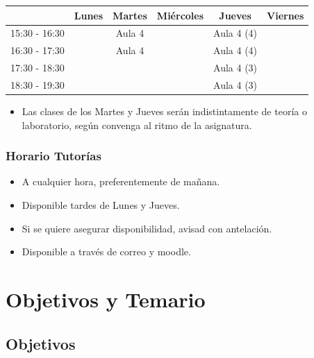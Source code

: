 \documentclass[a4paper,t,xcolor=pst,dvips,colortheme]{beamer}
\begin{document}
\begin{frame}[c]
\begin{small}
{\begin{center}
    	\begin{tabular}{||l|c|c|c|c|c||}
    	\hline \hline
    				   & Lunes & Martes  & Miércoles & Jueves     & Viernes \\ \hline \hline
        15:30 - 16:30  &       & Aula 4  &           & Aula 4 (4) &         \\ \hline
        16:30 - 17:30  &       & Aula 4  &           & Aula 4 (4) &         \\ \hline
    	17:30 - 18:30  &       &         &           & Aula 4 (3) &         \\ \hline
        18:30 - 19:30  &       &         &           & Aula 4 (3) &         \\ \hline
        \hline
    	\end{tabular}
    	\end{center}
    }

	\end{small}
	\begin{itemize}
        \item<3-> Las clases de los Martes y Jueves serán indistintamente de teoría o laboratorio, según convenga al ritmo de la asignatura.
	\end{itemize}
\end{frame}

\begin{frame}[c]
	\frametitle{Horario Tutorías}
    \begin{itemize}[<+->]
        \item A cualquier hora, preferentemente de mañana.
        \item Disponible tardes de Lunes y Jueves.
        \item Si se quiere asegurar disponibilidad, avisad con antelación.
        \item Disponible a través de correo y \alert{moodle}.
	\end{itemize}
\end{frame}

\section{Objetivos y Temario}

\subsection{Objetivos}
\end{document}
